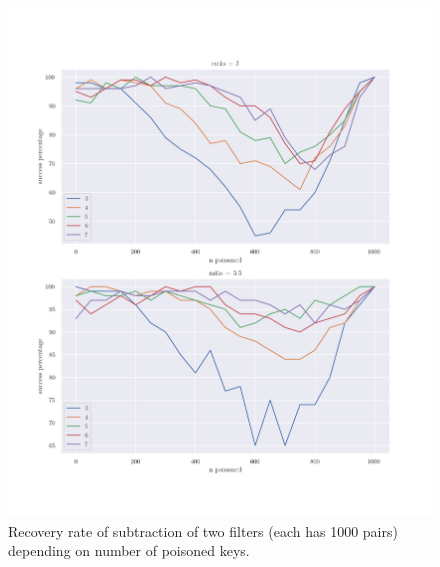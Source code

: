 \documentclass{article}
\begin{document}
\begin{figure}[h]
\centering
\includegraphics[scale=0.75]{./poisoned50.png}
\caption{Recovery rate of subtraction of two filters (each has 1000 pairs) depending on
number of poisoned keys.}
\end{figure}



\end{document}
